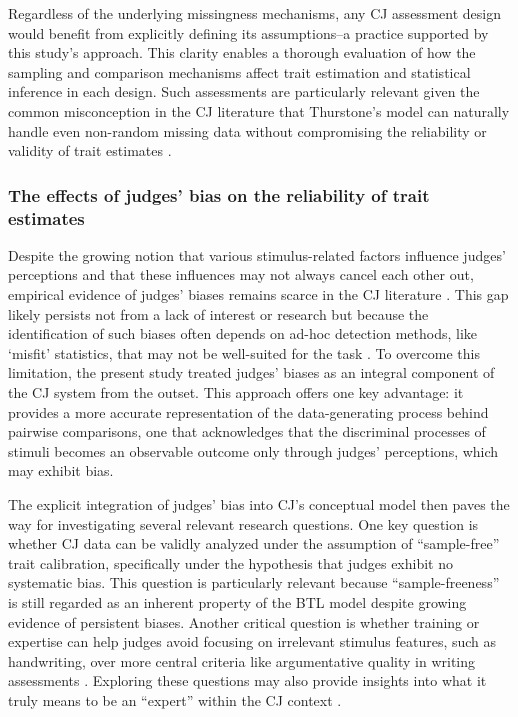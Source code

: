 \documentclass[
  authoryear,
  review,
  1p]{elsarticle}
\begin{document}
Regardless of the underlying missingness mechanisms, any CJ assessment
design would benefit from explicitly defining its assumptions--a
practice supported by this study's approach. This clarity enables a
thorough evaluation of how the sampling and comparison mechanisms affect
trait estimation and statistical inference in each design. Such
assessments are particularly relevant given the common misconception in
the CJ literature that Thurstone's model can naturally handle even
non-random missing data without compromising the reliability or validity
of trait estimates \citep{Bramley_2008}.

\subsubsection{The effects of judges' bias on the reliability of trait
estimates}\label{sec-discussion_RA2}

Despite the growing notion that various stimulus-related factors
influence judges' perceptions
\citep{vanDaal_et_al_2016, Lesterhuis_et_al_2018, Chambers_et_al_2022}
and that these influences may not always cancel each other out,
empirical evidence of judges' biases remains scarce in the CJ literature
\citep{Pollitt_et_al_2003, vanDaal_et_al_2016, Bartholomew_et_al_2020a}.
This gap likely persists not from a lack of interest or research but
because the identification of such biases often depends on ad-hoc
detection methods, like `misfit' statistics, that may not be well-suited
for the task \citep{Kelly_et_al_2022}. To overcome this limitation, the
present study treated judges' biases as an integral component of the CJ
system from the outset. This approach offers one key advantage: it
provides a more accurate representation of the data-generating process
behind pairwise comparisons, one that acknowledges that the discriminal
processes of stimuli becomes an observable outcome only through judges'
perceptions, which may exhibit bias.

The explicit integration of judges' bias into CJ's conceptual model then
paves the way for investigating several relevant research questions. One
key question is whether CJ data can be validly analyzed under the
assumption of ``sample-free'' trait calibration, specifically under the
hypothesis that judges exhibit no systematic bias. This question is
particularly relevant because ``sample-freeness'' is still regarded as
an inherent property of the BTL model \citep{Bramley_2008, Andrich_1978}
despite growing evidence of persistent biases. Another critical question
is whether training or expertise can help judges avoid focusing on
irrelevant stimulus features, such as handwriting, over more central
criteria like argumentative quality in writing assessments
\citep{Kelly_et_al_2022}. Exploring these questions may also provide
insights into what it truly means to be an ``expert'' within the CJ
context \citep{Kelly_et_al_2022}.
\end{document}
